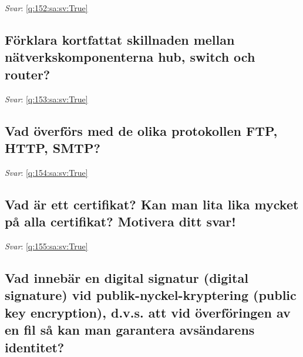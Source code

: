 \documentclass[a4paper,11pt,oneside]{article}
\begin{document}
\begin{sloppypar}
\textit{Svar}: \autoref{q:152:sa:sv:True}



\subsection{F\"orklara kortfattat skillnaden mellan n\"atverkskomponenterna hub, switch och router?}

\label{q:153:sa:sv:False}

\vspace{2cm}

\noindent\makebox[\textwidth]{\hrulefill}

\vspace{1cm}

\textit{Svar}: \autoref{q:153:sa:sv:True}



\subsection{Vad \"overf\"ors med de olika protokollen FTP, HTTP, SMTP?}

\label{q:154:sa:sv:False}

\vspace{2cm}

\noindent\makebox[\textwidth]{\hrulefill}

\vspace{1cm}

\textit{Svar}: \autoref{q:154:sa:sv:True}



\subsection{Vad \"ar ett certifikat? Kan man lita lika mycket p\r{a} alla certifikat? Motivera ditt svar!}

\label{q:155:sa:sv:False}

\vspace{2cm}

\noindent\makebox[\textwidth]{\hrulefill}

\vspace{1cm}

\textit{Svar}: \autoref{q:155:sa:sv:True}



\subsection{Vad inneb\"ar en digital signatur (digital signature) vid publik-nyckel-kryptering (public key encryption), d.v.s. att vid \"overf\"oringen av en fil s\r{a} kan man garantera avs\"andarens identitet?}


\end{sloppypar}
\end{document}
